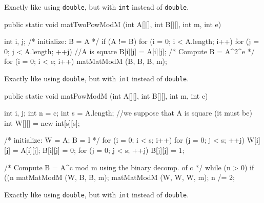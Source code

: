\begin{tabb} Exactly like  using \texttt{double}, but with \texttt{int} instead
  of \texttt{double}.
\end{tabb}
\begin{htmlonly}
\end{htmlonly}
\begin{code}

   public static void matTwoPowModM (int A[][], int B[][], int m, int e) \begin{hide} {
      int i, j;
      /* initialize: B = A */
      if (A != B) {
         for (i = 0; i < A.length; i++) {
            for (j = 0; j < A.length;  ++j)  //A is square
               B[i][j] = A[i][j];
         }
      }
      /* Compute B = A^{2^e} */
      for (i = 0; i < e; i++)
         matMatModM (B, B, B, m);
   } \end{hide}
\end{code}
\begin{tabb} Exactly like  using \texttt{double}, but with \texttt{int} instead of 
  \texttt{double}.
\end{tabb}
\begin{htmlonly}
\end{htmlonly}
\begin{code}

   public static void matPowModM (int A[][], int B[][], int m, int c) \begin{hide} {
      int i, j;
      int n = c;
      int s = A.length;   //we suppose that A is square (it must be)
      int W[][] = new int[s][s];

      /* initialize: W = A; B = I */
      for (i = 0; i < s; i++) {
         for (j = 0; j < s;  ++j)  {
            W[i][j] = A[i][j];
            B[i][j] = 0;
         }
      }
      for (j = 0; j < s;  ++j)
         B[j][j] = 1;

      /* Compute B = A^c mod m using the binary decomp. of c */
      while (n > 0) {
         if ((n %
            matMatModM (W, B, B, m);
         matMatModM (W, W, W, m);
         n /= 2;
      }
   } \end{hide}
\end{code}
\begin{tabb} Exactly like  using \texttt{double}, but with \texttt{int} instead
  of \texttt{double}.
\end{tabb}
\begin{htmlonly}
\end{htmlonly}




